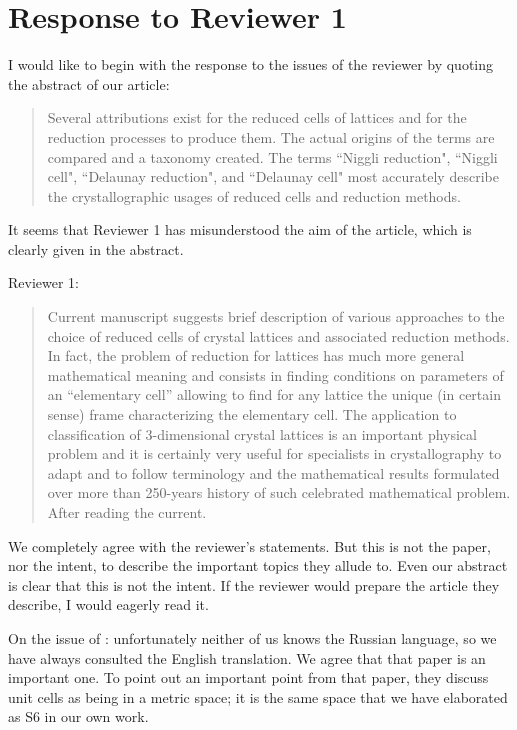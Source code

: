 \documentclass[preprint]{iucr}              %
\numberwithin{equation}{section}
\begin{document}
	\section{Response to Reviewer 1}
		
	I would like to begin with the response to the issues of the reviewer
	by quoting the abstract of our article:
	
\begin{quote}
	Several attributions exist for the reduced cells of lattices
	and for the reduction processes to produce them. The actual
	origins of the terms are compared and a taxonomy created. The
	terms ``Niggli reduction", ``Niggli cell", ``Delaunay reduction",
	and ``Delaunay cell" most accurately describe the crystallographic usages
	of reduced cells and reduction methods. 
\end{quote}

It seems that Reviewer 1 has misunderstood the aim of the article, which is clearly given in the abstract.

Reviewer 1:

\begin{quotation}
	Current manuscript suggests brief description of various approaches to the choice of
reduced cells of crystal lattices and associated reduction methods. In fact, the problem of
reduction for lattices has much more general mathematical meaning and consists in finding
conditions on parameters of an “elementary cell” allowing to find for any lattice the unique
(in certain sense) frame characterizing the elementary cell. The application to classification
of 3-dimensional crystal lattices is an important physical problem and it is certainly
very useful for specialists in crystallography to adapt and to follow terminology and
the mathematical results formulated over more than 250-years history of such celebrated
mathematical problem.
After reading the current.
\end{quotation}

We completely agree with the reviewer's statements. But this is not
the paper, nor the intent, to describe the important topics they allude to.
Even our abstract is clear that this is not the intent. If the reviewer
would prepare the article they describe, I would eagerly read it.

On the issue of \cite{Delone1975}: unfortunately neither of us knows
the Russian language, so we have always consulted the English translation.
We agree that that paper is an important one. To point out an
important point from that paper, they discuss unit cells as being in
a metric space; it is the same space that we have elaborated as S6 
in our own work.
\end{document}
